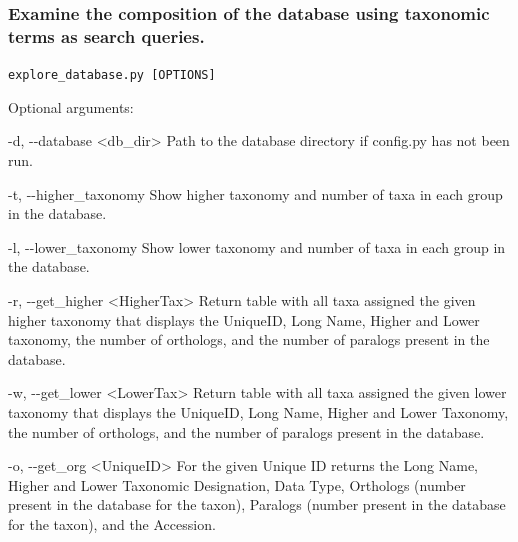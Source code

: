 \documentclass{article}
\def\code#1{\texttt{#1}}
\begin{document}
        \vspace{0.5cm}
        
        \subsubsection{Examine the composition of the database using taxonomic terms as search queries.}
        \begin{description}
        
            \vspace{0.2cm}
            \item \code{explore\_database.py [OPTIONS]}
            \vspace{0.2cm}
            
            \begin{description}
                \item Optional arguments:
                \begin{description}
                    \item -d, -\/-database \hspace{0.2cm} <db\_dir> \hspace{0.2cm} Path to the database directory if config.py has not been run.
                    \item -t, -\/-higher\_taxonomy \hspace{0.2cm} Show higher taxonomy and number of taxa in each group in the database.
                    \item -l, -\/-lower\_taxonomy \hspace{0.2cm} Show lower taxonomy and number of taxa in each group in the database.
                    \item -r, -\/-get\_higher \hspace{0.2cm} <HigherTax> \hspace{0.2cm} Return table with all taxa assigned the given higher taxonomy that displays the UniqueID, Long Name, Higher and Lower taxonomy, the number of orthologs, and the number of paralogs present in the database.
                    \item -w, -\/-get\_lower \hspace{0.2cm} <LowerTax> \hspace{0.2cm} Return table with all taxa assigned the given lower taxonomy that displays the UniqueID, Long Name, Higher and Lower Taxonomy, the number of orthologs, and the number of paralogs present in the database.
                    \item -o, -\/-get\_org \hspace{0.2cm} <UniqueID> \hspace{0.2cm} For the given Unique ID returns the Long Name, Higher and Lower Taxonomic Designation, Data Type, Orthologs (number present in the database for the taxon), Paralogs (number present in the database for the taxon), and the Accession.
                \end{description}
            \end{description}
        \end{description}
        
\end{document}
